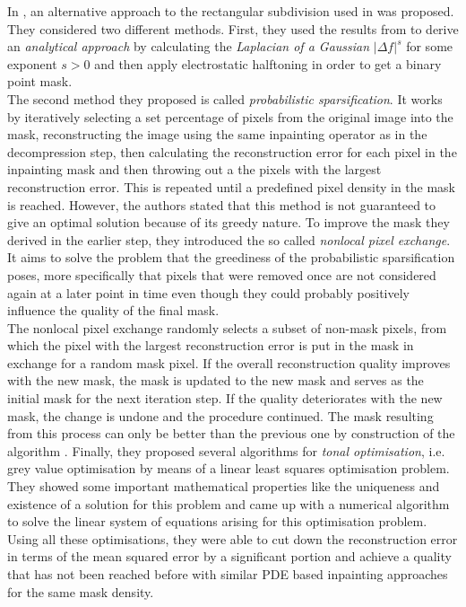 In \cite{hoeltgen12}, an alternative approach to the rectangular subdivision used in
\cite{schmaltz09} was proposed. They considered two different methods. First, they used the results
from \cite{belhachmi09} to derive an \textit{analytical approach} by calculating the \textit{Laplacian of a
Gaussian} $\vert \Delta f \vert^s$ for some exponent $s>0$ and then apply electrostatic 
halftoning\cite{electrostatic} in order to get a binary point mask.\\
The second method they proposed is called \textit{probabilistic sparsification}. It works by
iteratively selecting a set percentage of pixels from the original image into the mask,
reconstructing the image using the same inpainting operator as in the decompression step, then
calculating the reconstruction error for each pixel in the inpainting mask and then throwing out a
the pixels with the largest reconstruction error. This is repeated until a predefined pixel
density in the mask is reached. However, the authors stated that this method is not guaranteed to
give an optimal solution because of its greedy nature. To improve the mask they derived in the
earlier step, they introduced the so called \textit{nonlocal pixel exchange}. It aims to solve the
problem that the greediness of the probabilistic sparsification poses, more specifically that
pixels that were removed once are not considered again at a later point in time even though they
could probably positively influence the quality of the final mask.\\
The nonlocal pixel exchange randomly selects a subset of non-mask pixels, from which the pixel with
the largest reconstruction error is put in the mask in exchange for a random mask pixel.
If the overall reconstruction quality improves with the new mask, the mask is updated to the new
mask and serves as the initial mask for the next iteration step. If the quality deteriorates with
the new mask, the change is undone and the procedure continued.
The mask resulting from this process can only be better than the previous one by construction of
the algorithm \cite{hoeltgen12}.
Finally, they proposed several algorithms for \textit{tonal optimisation}, i.e. grey value
optimisation by means of a linear least squares optimisation problem. They showed some important
mathematical properties like the uniqueness and existence of a solution for this problem and
came up with a numerical algorithm to solve the linear system of equations arising for this
optimisation problem.
Using all these optimisations, they were able to cut down the reconstruction error in terms of the
mean squared error by a significant portion and achieve a quality that has not been reached before 
with similar PDE based inpainting approaches for the same mask density.


